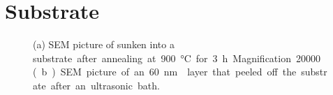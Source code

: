 \section{\Ir Substrate}\label{sec::ir_substrate}


\begin{figure}[tp]
	\begin{subfigure}[t]{ 0.49\linewidth}
		\caption{}
		\centering
		\label{subfig::sunken_nd}
	\end{subfigure}
	\hfill
	\begin{subfigure}[t]{ 0.49\linewidth}
		\caption{}
		\centering
		\label{subfig::peeled_ir}
	\end{subfigure}
	\caption{(a) SEM picture of \nds sunken into a \si substrate after annealing at \SI{900}{\celsius} for \SI{3}{h}. Magnification \num{20000} (b) SEM picture of an \SI{60}{nm} \ir layer that peeled off the substrate after an ultrasonic bath.}
	\label{fig::sem_substrates}
\end{figure}

